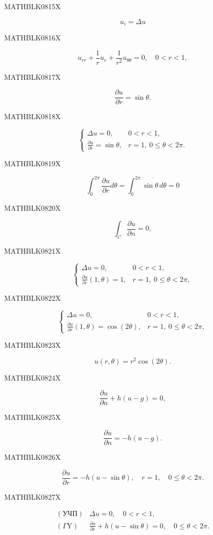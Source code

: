 \documentclass[
  ukrainian,
]{article}
\begin{document}
MATHBLK0815X

\[
u_i = \Delta u
\]

MATHBLK0816X

\[
u_{rr} + \frac{1}{r}u_r + \frac{1}{r^2}u_{\theta\theta} = 0, \quad 0 < r < 1,
\]

MATHBLK0817X

\[
\frac{\partial u}{\partial r} = \sin \theta.
\]

MATHBLK0818X

\[
\begin{cases} \Delta u = 0, & 0 < r < 1, \\ \frac{\partial u}{\partial r} = \sin \theta, & r = 1,\ 0 \le \theta < 2\pi. \end{cases}
\]

MATHBLK0819X

\[
\int_{0}^{2\pi} \frac{\partial u}{\partial r} d\theta = \int_{0}^{2\pi} \sin\theta \, d\theta = 0
\]

MATHBLK0820X

\[
\int_{C} \frac{\partial u}{\partial n} = 0,
\]

MATHBLK0821X

\[
\begin{cases} \Delta u = 0, & 0 < r < 1, \\ \frac{\partial u}{\partial r}(1, \theta) = 1, & r = 1,\ 0 \le \theta < 2\pi, \end{cases}
\]

MATHBLK0822X

\[
\begin{cases} \Delta u = 0, & 0 < r < 1, \\ \frac{\partial u}{\partial r}(1, \theta) = \cos(2\theta), & r = 1,\ 0 \le \theta < 2\pi, \end{cases}
\]

MATHBLK0823X

\[
u(r,\theta)=r^2\cos{(2\theta)}.
\]

MATHBLK0824X

\[
\frac{\partial u}{\partial n} + h (u - g) = 0,
\]

MATHBLK0825X

\[
\frac{\partial u}{\partial n} = -h (u - g).
\]

MATHBLK0826X

\[
\frac{\partial u}{\partial r} = -h(u - \sin \theta), \quad r = 1, \quad 0 \le \theta < 2\pi.
\]

MATHBLK0827X

\[
\begin{array}{llll} (\text{УЧП}) & \Delta u = 0, \quad 0 < r < 1, \\ (\Gamma \text{Y}) & \frac{\partial u}{\partial r} + h \left( u - \sin \theta \right) = 0, \quad 0 \leqslant \theta < 2\pi. \end{array}
\]
\end{document}
